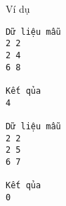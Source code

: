 Ví dụ
\begin{verbatim}
Dữ liệu mẫu
2 2
2 4
6 8

Kết qủa
4

Dữ liệu mẫu
2 2
2 5
6 7

Kết qủa
0
\end{verbatim}